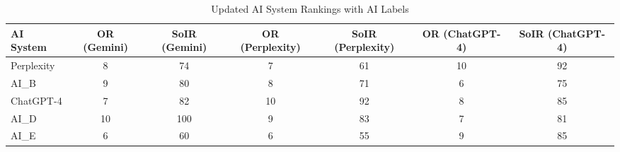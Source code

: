 \begin{table}[h]
\centering
\caption{Updated AI System Rankings with AI Labels}
\label{tab:ai_rankings_ai}
\begin{tabular}{lcccccc}
\hline
\textbf{AI System} & \textbf{OR (Gemini)} & \textbf{SoIR (Gemini)} & \textbf{OR (Perplexity)} & \textbf{SoIR (Perplexity)} & \textbf{OR (ChatGPT-4)} & \textbf{SoIR (ChatGPT-4)} \\
\hline
Perplexity & 8 & 74 & 7 & 61 & 10 & 92 \\
AI\_B & 9 & 80 & 8 & 71 & 6 & 75 \\
ChatGPT-4 & 7 & 82 & 10 & 92 & 8 & 85 \\
AI\_D & 10 & 100 & 9 & 83 & 7 & 81 \\
AI\_E & 6 & 60 & 6 & 55 & 9 & 85 \\
\hline
\end{tabular}
\end{table}
